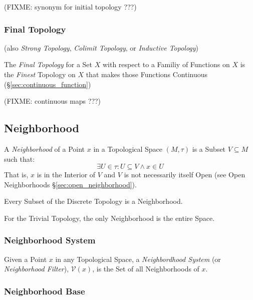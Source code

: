 (FIXME: synonym for initial topology ???)



\subsubsection{Final Topology}\label{sec:final_topology}

(also \emph{Strong Topology}, \emph{Colimit Topology}, or
\emph{Inductive Topology})

The \emph{Final Topology} for a Set $X$ with respect to a Familiy of
Functions on $X$ is the \emph{Finest} Topology on $X$ that makes those
Functions Continuous (\S\ref{sec:continuous_function})

(FIXME: continuous maps ???)



\subsection{Neighborhood}\label{sec:neighborhood}

A \emph{Neighborhood} of a Point $x$ in a Topological Space $(M,\tau)$
is a Subset $V \subseteq M$ such that:
\[
  \exists U \in \tau : U \subseteq V \wedge x \in U
\]
That is, $x$ is in the Interior of $V$ and $V$ is not necessarily
itself Open (see Open Neighborhoods \S\ref{sec:open_neighborhood}).

Every Subset of the Discrete Topology is a Neighborhood.

For the Trivial Topology, the only Neighborhood is the entire Space.



\subsubsection{Neighborhood System}\label{sec:neighborhood_system}

Given a Point $x$ in any Topological Space, a \emph{Neighbordhood
  System} (or \emph{Neighborhood Filter}), $\mathcal{V}(x)$, is the
Set of all Neighborhoods of $x$.



\subsubsection{Neighborhood Base}\label{sec:neighborhood_base}

